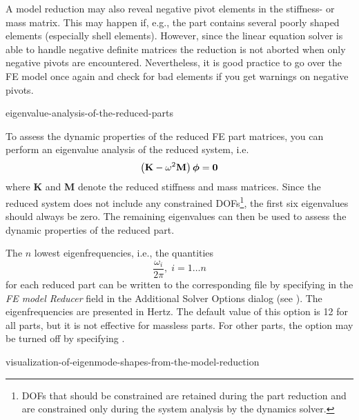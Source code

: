 {A model reduction may also reveal negative pivot elements in the stiffness- or
mass matrix. This may happen if, e.g., the part contains several poorly shaped
elements (especially shell elements).
However, since the linear equation solver is able to handle negative definite
matrices the reduction is not aborted when only negative pivots are encountered.
Nevertheless, it is good practice to go over the FE model once again and check
for bad elements if you get warnings on negative pivots.



           {eigenvalue-analysis-of-the-reduced-parts}

To assess the dynamic properties of the reduced FE part matrices,
you can perform an eigenvalue analysis of the reduced system, i.e.
$$\left({\bf K} - \omega^2{\bf M}\right)\mbox{\boldmath$\phi$} = {\bf 0}$$
where \textbf{K} and \textbf{M} denote the reduced stiffness and mass matrices.
Since the reduced system does not include any constrained DOFs\footnote{
DOFs that should be constrained are retained during the part reduction and are
constrained only during the system analysis by the dynamics solver.},
the first six eigenvalues should always be zero. The remaining eigenvalues
can then be used to assess the dynamic properties of the reduced part.

The $n$ lowest eigenfrequencies, i.e., the quantities
$$\frac{\omega_i}{2\pi}, \; i = 1 \ldots n $$
for each reduced part can be written to the corresponding  file
by specifying  in the {\sl FE model Reducer} field in the
Additional Solver Options dialog (see
).
The eigenfrequencies are presented in Hertz.
The default value of this option is 12 for all parts,
but it is not effective for massless parts.
For other parts, the option may be turned off by specifying .


           {visualization-of-eigenmode-shapes-from-the-model-reduction}

}
